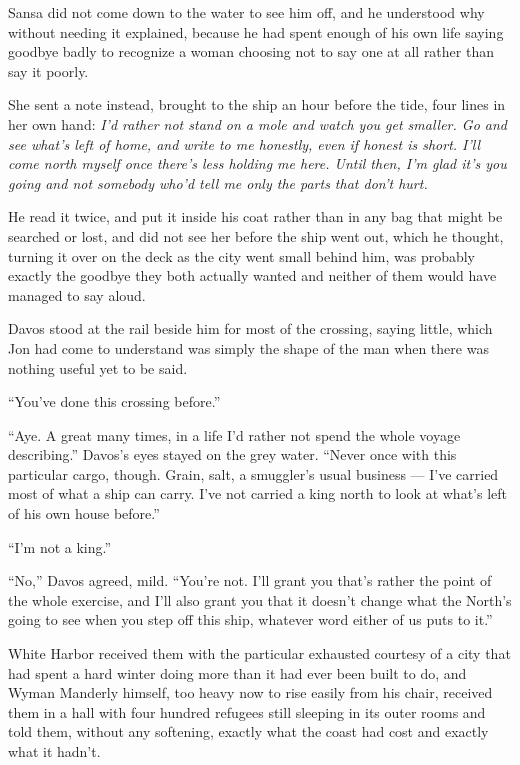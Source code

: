 Sansa did not come down to the water to see him off, and he understood why without needing it explained, because he had spent enough of his own life saying goodbye badly to recognize a woman choosing not to say one at all rather than say it poorly.

She sent a note instead, brought to the ship an hour before the tide, four lines in her own hand: \textit{I’d rather not stand on a mole and watch you get smaller. Go and see what’s left of home, and write to me honestly, even if honest is short. I’ll come north myself once there’s less holding me here. Until then, I’m glad it’s you going and not somebody who’d tell me only the parts that don’t hurt.}

He read it twice, and put it inside his coat rather than in any bag that might be searched or lost, and did not see her before the ship went out, which he thought, turning it over on the deck as the city went small behind him, was probably exactly the goodbye they both actually wanted and neither of them would have managed to say aloud.

\sceneBreak

Davos stood at the rail beside him for most of the crossing, saying little, which Jon had come to understand was simply the shape of the man when there was nothing useful yet to be said.

“You’ve done this crossing before.”

“Aye. A great many times, in a life I’d rather not spend the whole voyage describing.” Davos’s eyes stayed on the grey water. “Never once with this particular cargo, though. Grain, salt, a smuggler’s usual business — I’ve carried most of what a ship can carry. I’ve not carried a king north to look at what’s left of his own house before.”

“I’m not a king.”

“No,” Davos agreed, mild. “You’re not. I’ll grant you that’s rather the point of the whole exercise, and I’ll also grant you that it doesn’t change what the North’s going to see when you step off this ship, whatever word either of us puts to it.”

\sceneBreak

White Harbor received them with the particular exhausted courtesy of a city that had spent a hard winter doing more than it had ever been built to do, and Wyman Manderly himself, too heavy now to rise easily from his chair, received them in a hall with four hundred refugees still sleeping in its outer rooms and told them, without any softening, exactly what the coast had cost and exactly what it hadn’t.

